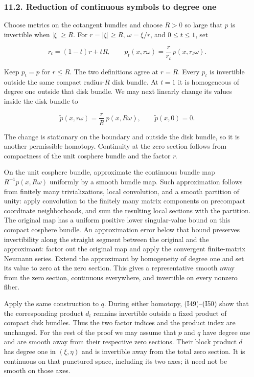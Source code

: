 \documentclass[
  11pt,
]{article}
\begin{document}
\subsubsection{11.2. Reduction of continuous symbols to degree
one}\label{reduction-of-continuous-symbols-to-degree-one}

Choose metrics on the cotangent bundles and choose \(R>0\) so large that
\(p\) is invertible when \(|\xi|\geq R\). For \(r=|\xi|\geq R\),
\(\omega=\xi/r\), and \(0\leq t\leq1\), set

\[
 r_t=(1-t)r+tR,\qquad
 p_t(x,r\omega)=\frac r{r_t}\,p(x,r_t\omega).
 \tag{I52}
\]

Keep \(p_t=p\) for \(r\leq R\). The two definitions agree at \(r=R\).
Every \(p_t\) is invertible outside the same compact radius-\(R\) disk
bundle. At \(t=1\) it is homogeneous of degree one outside that disk
bundle. We may next linearly change its values inside the disk bundle to

\[
 \widetilde p(x,r\omega)=\frac rR\,p(x,R\omega),\qquad
 \widetilde p(x,0)=0.
 \tag{I53}
\]

The change is stationary on the boundary and outside the disk bundle, so
it is another permissible homotopy. Continuity at the zero section
follows from compactness of the unit cosphere bundle and the factor
\(r\).

On the unit cosphere bundle, approximate the continuous bundle map
\(R^{-1}p(x,R\omega)\) uniformly by a smooth bundle map. Such
approximation follows from finitely many trivializations, local
convolution, and a smooth partition of unity: apply convolution to the
finitely many matrix components on precompact coordinate neighborhoods,
and sum the resulting local sections with the partition. The original
map has a uniform positive lower singular-value bound on this compact
cosphere bundle. An approximation error below that bound preserves
invertibility along the straight segment between the original and the
approximant: factor out the original map and apply the convergent
finite-matrix Neumann series. Extend the approximant by homogeneity of
degree one and set its value to zero at the zero section. This gives a
representative smooth away from the zero section, continuous everywhere,
and invertible on every nonzero fiber.

Apply the same construction to \(q\). During either homotopy,
(I49)--(I50) show that the corresponding product \(d_t\) remains
invertible outside a fixed product of compact disk bundles. Thus the two
factor indices and the product index are unchanged. For the rest of the
proof we may assume that \(p\) and \(q\) have degree one and are smooth
away from their respective zero sections. Their block product \(d\) has
degree one in \((\xi,\eta)\) and is invertible away from the total zero
section. It is continuous on that punctured space, including its two
axes; it need not be smooth on those axes.
\end{document}
